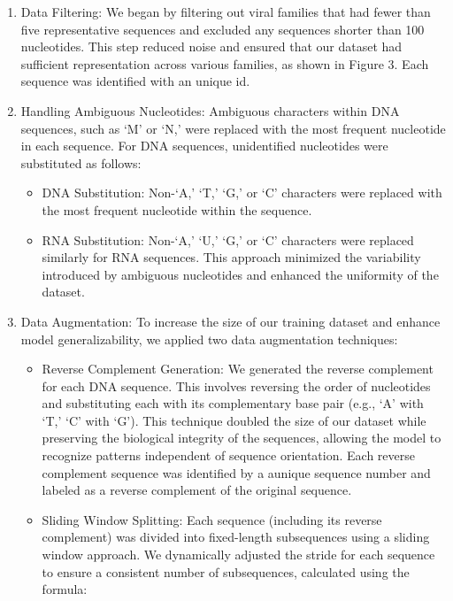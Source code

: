 \begin{enumerate}
\item{Data Filtering:}
We began by filtering out viral families that had fewer than five representative sequences and excluded any sequences shorter than 100 nucleotides. This step reduced noise and ensured that our dataset had sufficient representation across various families, as shown in Figure 3. Each sequence was identified with an unique id.

\item{Handling Ambiguous Nucleotides:}
Ambiguous characters within DNA sequences, such as ‘M’ or ‘N,’ were replaced with the most frequent nucleotide in each sequence. For DNA sequences, unidentified nucleotides were substituted as follows:

\begin{itemize}
\item{DNA Substitution:} Non-‘A,’ ‘T,’ ‘G,’ or ‘C’ characters were replaced with the most frequent nucleotide within the sequence.
\item{RNA Substitution:} Non-‘A,’ ‘U,’ ‘G,’ or ‘C’ characters were replaced similarly for RNA sequences. This approach minimized the variability introduced by ambiguous nucleotides and enhanced the uniformity of the dataset.
\end{itemize}

\item{Data Augmentation:}
To increase the size of our training dataset and enhance model generalizability, we applied two data augmentation techniques:
\begin{itemize}
\item{Reverse Complement Generation:}
We generated the reverse complement for each DNA sequence. This involves reversing the order of nucleotides and substituting each with its complementary base pair (e.g., ‘A’ with ‘T,’ ‘C’ with ‘G’). This technique doubled the size of our dataset while preserving the biological integrity of the sequences, allowing the model to recognize patterns independent of sequence orientation. Each reverse complement sequence was identified by a aunique sequence number and labeled as a reverse complement of the original sequence.

\item{Sliding Window Splitting:}
Each sequence (including its reverse complement) was divided into fixed-length subsequences using a sliding window approach. We dynamically adjusted the stride for each sequence to ensure a consistent number of subsequences, calculated using the formula:


\end{itemize}
\end{enumerate}

